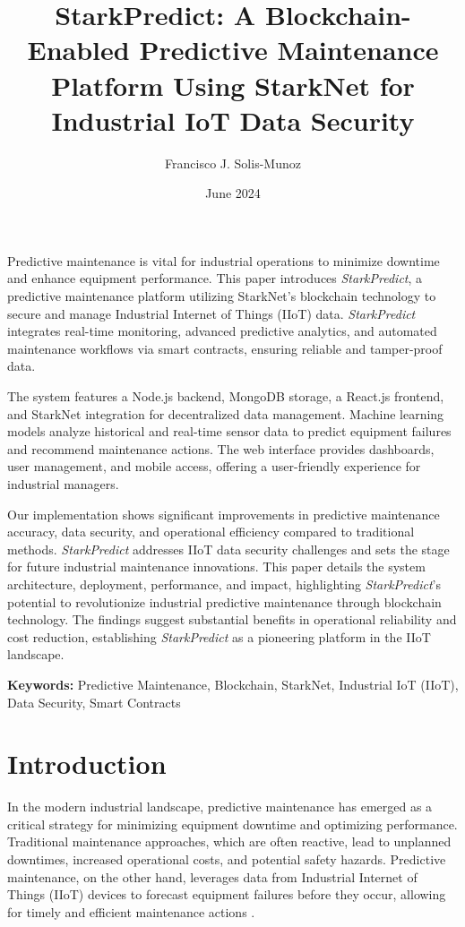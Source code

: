 \documentclass{article}
\title{StarkPredict: A Blockchain-Enabled Predictive Maintenance Platform Using StarkNet for Industrial IoT Data Security}
\author{Francisco J. Solis-Munoz}
\date{June 2024}
\begin{document}
\maketitle

Predictive maintenance is vital for industrial operations to minimize downtime and enhance equipment performance. This paper introduces \textit{StarkPredict}, a predictive maintenance platform utilizing StarkNet's blockchain technology to secure and manage Industrial Internet of Things (IIoT) data. \textit{StarkPredict} integrates real-time monitoring, advanced predictive analytics, and automated maintenance workflows via smart contracts, ensuring reliable and tamper-proof data.

The system features a Node.js backend, MongoDB storage, a React.js frontend, and StarkNet integration for decentralized data management. Machine learning models analyze historical and real-time sensor data to predict equipment failures and recommend maintenance actions. The web interface provides dashboards, user management, and mobile access, offering a user-friendly experience for industrial managers.

Our implementation shows significant improvements in predictive maintenance accuracy, data security, and operational efficiency compared to traditional methods. \textit{StarkPredict} addresses IIoT data security challenges and sets the stage for future industrial maintenance innovations. This paper details the system architecture, deployment, performance, and impact, highlighting \textit{StarkPredict}'s potential to revolutionize industrial predictive maintenance through blockchain technology. The findings suggest substantial benefits in operational reliability and cost reduction, establishing \textit{StarkPredict} as a pioneering platform in the IIoT landscape.

\textbf{Keywords:} Predictive Maintenance, Blockchain, StarkNet, Industrial IoT (IIoT), Data Security, Smart Contracts
\section{Introduction}
In the modern industrial landscape, predictive maintenance has emerged as a critical strategy for minimizing equipment downtime and optimizing performance. Traditional maintenance approaches, which are often reactive, lead to unplanned downtimes, increased operational costs, and potential safety hazards. Predictive maintenance, on the other hand, leverages data from Industrial Internet of Things (IIoT) devices to forecast equipment failures before they occur, allowing for timely and efficient maintenance actions \cite{lee2018predictive, kang2016smart}.
\end{document}
